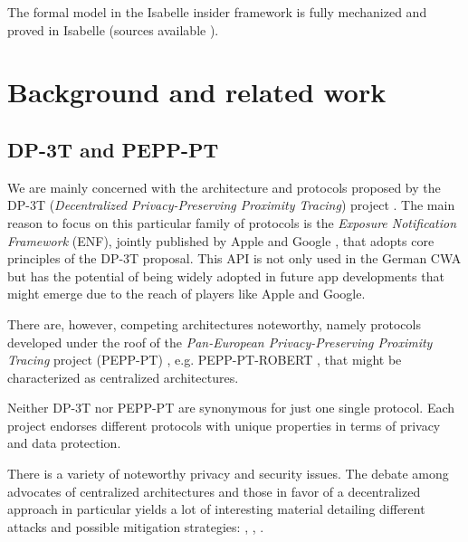 \documentclass{llncs}
\begin{document}
The formal model in the Isabelle insider framework is fully mechanized and proved in
Isabelle (sources available \cite{kam:18smc}). 

\section{Background and related work}
\label{sec:background}
\subsection{DP-3T and PEPP-PT}
\label{sec:history}
We are mainly concerned with the architecture and protocols proposed by the
DP-3T (\textit{Decentralized Privacy-Preserving Proximity Tracing}) project \cite{dp3t:github}.
The main reason to focus on this particular family of protocols is the
\textit{Exposure Notification Framework} (ENF), jointly published by Apple and Google \cite{enf:proj}, that adopts
core principles of the DP-3T proposal. This API is not only used in the German
CWA but has the potential of being widely adopted in future
app developments that might emerge due to the reach of players like Apple and Google.

There are, however, competing architectures noteworthy, namely protocols developed under the
roof of the \textit{Pan-European Privacy-Preserving Proximity Tracing} project (PEPP-PT) \cite{pepppt:github}, e.g.
PEPP-PT-ROBERT \cite{pepppt:ROBERT},
that might be characterized as centralized architectures.

Neither DP-3T nor PEPP-PT are synonymous for just one single protocol. Each project endorses
different protocols with unique properties in terms of privacy and data protection.

There is a variety of noteworthy privacy and security issues. %
The debate among advocates of centralized architectures and those in favor of a decentralized approach in particular yields a lot of interesting material detailing different attacks and possible mitigation strategies: \cite{pepppt:dp3tana}, \cite{pepppt:dp3tresp}, \cite{dp3t:psre}.
\end{document}
